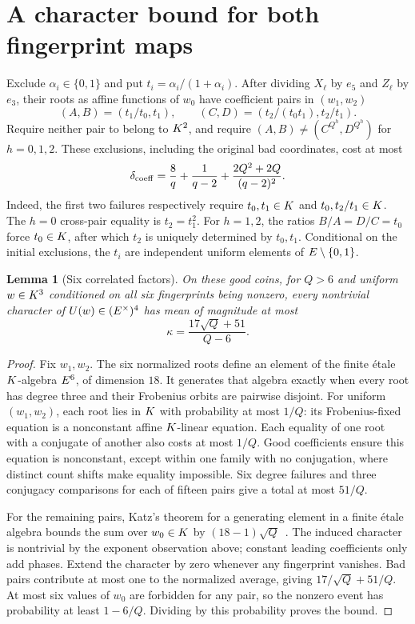\documentclass[11pt]{article}
\newtheorem{lemma}{Lemma}
\begin{document}
\section{A character bound for both fingerprint maps}

Exclude $\alpha_i\in\{0,1\}$ and put $t_i=\alpha_i/(1+\alpha_i)$. After dividing $X_\ell$ by $e_5$ and $Z_\ell$ by $e_3$, their roots as affine functions of $w_0$ have coefficient pairs in $(w_1,w_2)$
\[
 (A,B)=(t_1/t_0,t_1),\qquad
 (C,D)=(t_2/(t_0t_1),t_2/t_1).
\]
Require neither pair to belong to $K^2$, and require $(A,B)\ne(C^{Q^h},D^{Q^h})$ for $h=0,1,2$. These exclusions, including the original bad coordinates, cost at most
\[
 \delta_{\rm coeff}=\frac8q+\frac1{q-2}
       +\frac{2Q^2+2Q}{(q-2)^2}.
\]
Indeed, the first two failures respectively require $t_0,t_1\in K$ and $t_0,t_2/t_1\in K$. The $h=0$ cross-pair equality is $t_2=t_1^2$. For $h=1,2$, the ratios $B/A=D/C=t_0$ force $t_0\in K$, after which $t_2$ is uniquely determined by $t_0,t_1$. Conditional on the initial exclusions, the $t_i$ are independent uniform elements of $E\setminus\{0,1\}$.

\begin{lemma}[Six correlated factors]
On these good coins, for $Q>6$ and uniform $w\in K^3$ conditioned on all six fingerprints being nonzero, every nontrivial character of $U(w)\in(E^\times)^4$ has mean of magnitude at most
\[
 \kappa=\frac{17\sqrt Q+51}{Q-6}.
\]
\end{lemma}
\begin{proof}
Fix $w_1,w_2$. The six normalized roots define an element of the finite \'etale $K$-algebra $E^6$, of dimension $18$. It generates that algebra exactly when every root has degree three and their Frobenius orbits are pairwise disjoint. For uniform $(w_1,w_2)$, each root lies in $K$ with probability at most $1/Q$: its Frobenius-fixed equation is a nonconstant affine $K$-linear equation. Each equality of one root with a conjugate of another also costs at most $1/Q$. Good coefficients ensure this equation is nonconstant, except within one family with no conjugation, where distinct count shifts make equality impossible. Six degree failures and three conjugacy comparisons for each of fifteen pairs give a total at most $51/Q$.

For the remaining pairs, Katz's theorem for a generating element in a finite \'etale algebra bounds the sum over $w_0\in K$ by $(18-1)\sqrt Q$~\cite{katz}. The induced character is nontrivial by the exponent observation above; constant leading coefficients only add phases. Extend the character by zero whenever any fingerprint vanishes. Bad pairs contribute at most one to the normalized average, giving $17/\sqrt Q+51/Q$. At most six values of $w_0$ are forbidden for any pair, so the nonzero event has probability at least $1-6/Q$. Dividing by this probability proves the bound.
\end{proof}
\end{document}
